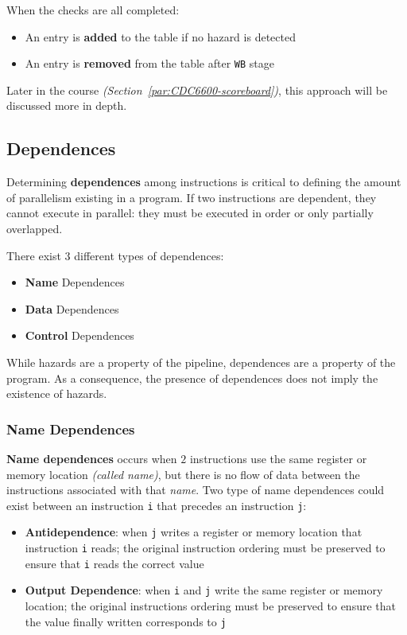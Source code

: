 \documentclass[english]{article}
\begin{document}
When the checks are all completed:

\begin{itemize}
  \item An entry is \textbf{added} to the table if no hazard is detected
  \item An entry is \textbf{removed} from the table after \texttt{WB} stage
\end{itemize}

\bigskip
Later in the course \textit{(Section~\ref{par:CDC6600-scoreboard})}, this approach will be discussed more in depth.

\subsection{Dependences}

Determining \textbf{dependences} among instructions is critical to defining the amount of parallelism existing in a program.
If two instructions are dependent, they cannot execute in parallel: they must be executed in order or only partially overlapped.

There exist \(3\) different types of dependences:

\begin{itemize}
  \item \textbf{Name} Dependences
  \item \textbf{Data} Dependences
  \item \textbf{Control} Dependences
\end{itemize}

While hazards are a property of the pipeline, dependences are a property of the program.
As a consequence, the presence of dependences does not imply the existence of hazards.

\subsubsection{Name Dependences}

\textbf{Name dependences} occurs when \(2\) instructions use the same register or memory location \textit{(called name)}, but there is no flow of data between the instructions associated with that \textit{name}.
Two type of name dependences could exist between an instruction \texttt{i} that precedes an instruction \texttt{j}:

\begin{itemize}
  \item \textbf{Antidependence}: when \texttt{j} writes a register or memory location that instruction \texttt{i} reads; the original instruction ordering must be preserved to ensure that \texttt{i} reads the correct value
  \item \textbf{Output Dependence}: when \texttt{i} and \texttt{j} write the same register or memory location; the original instructions ordering must be preserved to ensure that the value finally written corresponds to \texttt{j}
\end{itemize}
\end{document}

